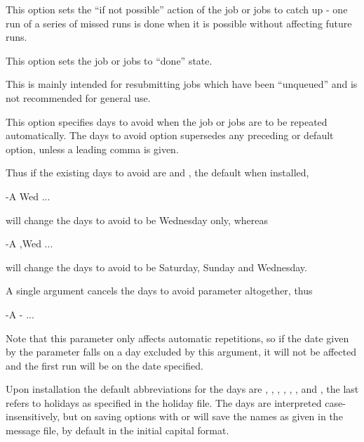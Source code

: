 
This option sets the ``if not possible'' action of the job or jobs to catch up - one run of a series of missed runs is done when it is possible without affecting future runs.


This option sets the job or jobs to ``done'' state.

This is mainly intended for resubmitting jobs which have been ``unqueued'' and is not recommended for general use.


This option specifies days to avoid when the job or jobs are to be repeated automatically. The days to avoid option supersedes any
preceding or default option, unless a leading comma is given.

Thus if the existing days to avoid are  and , the default when installed,

\begin{expara}

\BtrName{} -A Wed ...

\end{expara}

will change the days to avoid to be Wednesday only, whereas

\begin{expara}

\BtrName{} -A ,Wed ...

\end{expara}

will change the days to avoid to be Saturday, Sunday and Wednesday.

A single \exampletext{{}-} argument cancels the days to avoid parameter altogether, thus

\begin{expara}

\BtrName{} -A {}- ...

\end{expara}

Note that this parameter only affects automatic repetitions, so if the date given by the  parameter falls on a day
excluded by this argument, it will not be affected and the first run will be on the date specified.

Upon installation the default abbreviations for the days are , , , ,
, ,  and , the last refers to holidays as specified in the holiday file.
The days are interpreted case-insensitively, but on saving options with  or
 will save the names as given in the message file, by default in the initial capital format.

